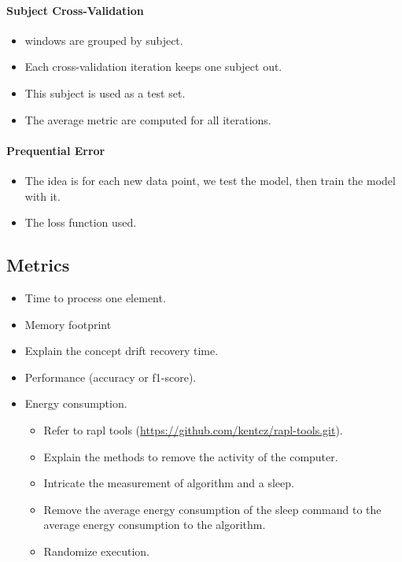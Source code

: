 \paragraph{Subject Cross-Validation~\cite{subject_cross_validation}}
\begin{itemize}
	\item windows are grouped by subject.
	\item Each cross-validation iteration keeps one subject out.
	\item This subject is used as a test set.
	\item The average metric are computed for all iterations.
\end{itemize}

\paragraph{Prequential Error~\cite{issues_learning_from_stream}}
\begin{itemize}
	\item The idea is for each new data point, we test the model, then train the model with it.
	\item The loss function used.
\end{itemize}


\subsection{Metrics}
\begin{itemize}
	\item Time to process one element.
	\item Memory footprint
	\item Explain the concept drift recovery time.
	\item Performance (accuracy or f1-score).
	\item Energy consumption.
	\begin{itemize}
		\item Refer to rapl tools (\url{https://github.com/kentcz/rapl-tools.git}).
		\item Explain the methods to remove the activity of the computer.
		\item Intricate the measurement of algorithm and a sleep.
		\item Remove the average energy consumption of the sleep command to the average energy consumption to the algorithm.
		\item Randomize execution.
	\end{itemize}
\end{itemize}

